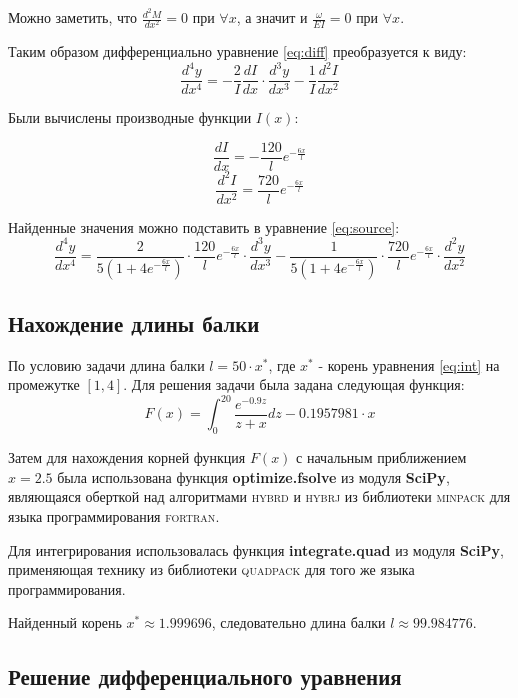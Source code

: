 Можно заметить, что $\frac{d^2M}{dx^2} = 0$ при $\forall x$, а значит и $\frac{\omega}{EI} = 0$ при $\forall x$.

Таким образом дифференциально уравнение \ref{eq:diff} преобразуется к виду:
\begin{equation}\label{eq:source}
	\frac{d^4y}{dx^4} = - \frac{2}{I} \frac{dI}{dx}\cdot \frac{d^3y}{dx^3} - \frac{1}{I} \frac{d^2I}{dx^2}
\end{equation}

Были вычислены производные функции $I(x)$:
\begin{multicols}{2}
\noindent
\[
	\frac{dI}{dx} = -\frac{120}{l}e^{-\frac{6x}{l}}
\]
\[
	\frac{d^2I}{dx^2} = \frac{720}{l}e^{-\frac{6x}{l}}
\]
\end{multicols}

Найденные значения можно подставить в уравнение \ref{eq:source}:
\begin{equation}
\frac{d^4y}{dx^4} = \frac{2}{5(1 + 4e^{-\frac{6x}{l}})} \cdot \frac{120}{l}e^{-\frac{6x}{l}} \cdot \frac{d^3y}{dx^3} - 
\frac{1}{5(1 + 4e^{-\frac{6x}{l}})} \cdot \frac{720}{l}e^{-\frac{6x}{l}} \cdot \frac{d^2y}{dx^2}
\end{equation}

\subsection{Нахождение длины балки}

По условию задачи длина балки $l = 50\cdot x^*$, где $x^*$ - корень уравнения \ref{eq:int} на промежутке $[1, 4]$. Для решения задачи была задана следующая функция:
\begin{equation}
F(x) = \int_0^{20} \frac{e^{-0.9z}}{z+x}dz - 0.1957981\cdot x
\end{equation}

Затем для нахождения корней функция $F(x)$ с начальным приближением $x = 2.5$ была использована функция \textbf{optimize.fsolve} из модуля \textbf{SciPy}, являющаяся оберткой над алгоритмами \textsc{hybrd} и \textsc{hybrj} из библиотеки \textsc{minpack} для языка программирования \textsc{fortran}. 

Для интегрирования использовалась функция \textbf{integrate.quad} из модуля \textbf{SciPy}, применяющая технику из библиотеки \textsc{quadpack} для того же языка программирования.

Найденный корень $x^* \approx 1.999696$, следовательно длина балки 
$l \approx 99.984776$.

\subsection{Решение дифференциального уравнения}

